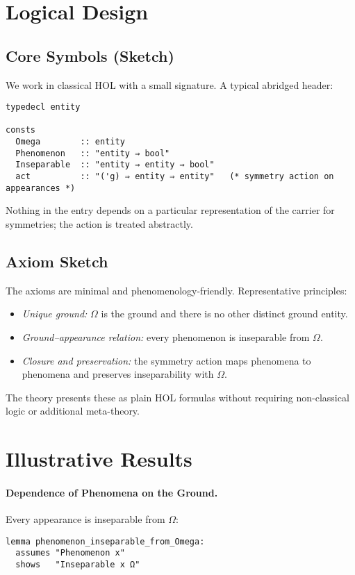 \documentclass[11pt,a4paper]{article}
\begin{document}
\section{Logical Design}

\subsection{Core Symbols (Sketch)}

We work in classical HOL with a small signature. A typical abridged header:
\begin{lstlisting}
typedecl entity

consts
  Omega        :: entity
  Phenomenon   :: "entity ⇒ bool"
  Inseparable  :: "entity ⇒ entity ⇒ bool"
  act          :: "('g) ⇒ entity ⇒ entity"   (* symmetry action on appearances *)
\end{lstlisting}

Nothing in the entry depends on a particular representation of the carrier for
symmetries; the action is treated abstractly.

\subsection{Axiom Sketch}

The axioms are minimal and phenomenology-friendly. Representative principles:
\begin{itemize}
  \item \emph{Unique ground:} \(\Omega\) is the ground and there is no other
        distinct ground entity.
  \item \emph{Ground--appearance relation:} every phenomenon is inseparable
        from \(\Omega\).
  \item \emph{Closure and preservation:} the symmetry action maps phenomena to
        phenomena and preserves inseparability with \(\Omega\).
\end{itemize}
The theory presents these as plain HOL formulas without requiring non-classical
logic or additional meta-theory.

\section{Illustrative Results}

\paragraph{Dependence of Phenomena on the Ground.}
Every appearance is inseparable from \(\Omega\):
\begin{lstlisting}
lemma phenomenon_inseparable_from_Omega:
  assumes "Phenomenon x"
  shows   "Inseparable x Ω"
\end{lstlisting}
\end{document}
